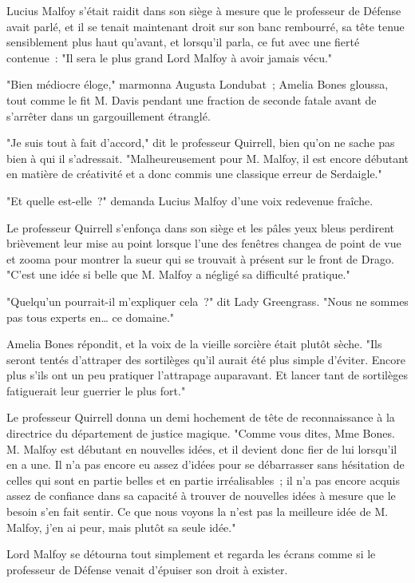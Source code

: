 Lucius Malfoy s'était raidit dans son siège à mesure que le professeur de Défense avait parlé, et il se tenait maintenant droit sur son banc rembourré, sa tête tenue sensiblement plus haut qu'avant, et lorsqu'il parla, ce fut avec une fierté contenue~: "Il sera le plus grand Lord Malfoy à avoir jamais vécu."

"Bien médiocre éloge," marmonna Augusta Londubat~; Amelia Bones gloussa, tout comme le fit M. Davis pendant une fraction de seconde fatale avant de s'arrêter dans un gargouillement étranglé.

"Je suis tout à fait d'accord," dit le professeur Quirrell, bien qu'on ne sache pas bien à qui il s'adressait. "Malheureusement pour M. Malfoy, il est encore débutant en matière de créativité et a donc commis une classique erreur de Serdaigle."

"Et quelle est-elle~?" demanda Lucius Malfoy d'une voix redevenue fraîche.

Le professeur Quirrell s'enfonça dans son siège et les pâles yeux bleus perdirent brièvement leur mise au point lorsque l'une des fenêtres changea de point de vue et zooma pour montrer la sueur qui se trouvait à présent sur le front de Drago. "C'est une idée si belle que M. Malfoy a négligé sa difficulté pratique."

"Quelqu'un pourrait-il m'expliquer cela~?" dit Lady Greengrass. "Nous ne sommes pas tous experts en… ce domaine."

Amelia Bones répondit, et la voix de la vieille sorcière était plutôt sèche. "Ils seront tentés d'attraper des sortilèges qu'il aurait été plus simple d'éviter. Encore plus s'ils ont un peu pratiquer l'attrapage auparavant. Et lancer tant de sortilèges fatiguerait leur guerrier le plus fort."

Le professeur Quirrell donna un demi hochement de tête de reconnaissance à la directrice du département de justice magique. "Comme vous dites, Mme Bones. M. Malfoy est débutant en nouvelles idées, et il devient donc fier de lui lorsqu'il en a une. Il n'a pas encore eu assez d'idées pour se débarrasser sans hésitation de celles qui sont en partie belles et en partie irréalisables~; il n'a pas encore acquis assez de confiance dans sa capacité à trouver de nouvelles idées à mesure que le besoin s'en fait sentir. Ce que nous voyons la n'est pas la meilleure idée de M. Malfoy, j'en ai peur, mais plutôt sa seule idée."

Lord Malfoy se détourna tout simplement et regarda les écrans comme si le professeur de Défense venait d'épuiser son droit à exister.

